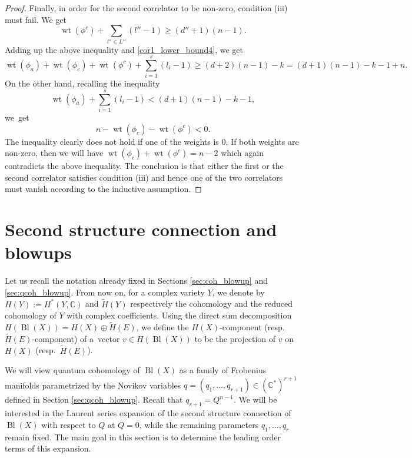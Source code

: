 \documentclass[pdftex]{sigma}
\numberwithin{equation}{section}
\newcommand{\CC}{\mathbb{C}}
\begin{document}
\begin{proof}
Finally, in order for the second correlator to be non-zero, condition (iii) must fail. We get
\[
\operatorname{wt}(\phi^c) + \sum_{l''\in L''} (l''-1) \geq (d''+1)(n-1).
\]
Adding up the above inequality and \eqref{cor1_lower_bound4}, we get
\[
\operatorname{wt}(\phi_a) + \operatorname{wt}(\phi_c) + \operatorname{wt}(\phi^c)+
\sum_{i=1}^s (l_i-1) \geq (d+2)(n-1) -k = (d+1)(n-1)-k-1 + n.
\]
On the other hand, recalling the inequality
\[
\operatorname{wt}(\phi_a)+ \sum_{i=1}^s (l_i-1) < (d+1)(n-1)-k-1,
\]
 we~get
\[
n-\operatorname{wt}(\phi_c) - \operatorname{wt}(\phi^c) < 0.
\]
The inequality clearly does not hold if one of the weights is $0$. If both weights are non-zero, then we will have $\operatorname{wt}(\phi_c) + \operatorname{wt}(\phi^c)= n-2$ which again contradicts the above inequality. The conclusion is that either the first or the second correlator satisfies condition (iii) and hence one of the two correlators must vanish according to the inductive assumption.
\end{proof}

\section{Second structure connection and blowups}
\label{sec:2nd_sc_blowups}

Let us recall the notation already fixed in
Sections \ref{sec:coh_blowup} and \ref{sec:qcoh_blowup}. From now on, for a complex variety $Y$, we denote by $H(Y):=H^*(Y,\CC)$
and $\widetilde{H}(Y)$ respectively the cohomology and the reduced
cohomology of $Y$ with complex coefficients. Using the direct sum decomposition~$H(\operatorname{Bl}(X))=H(X)\oplus \widetilde{H}(E)$, we define the $H(X)$-component (resp.\ $\widetilde{H}(E)$-component) of a~vector $v\in H(\operatorname{Bl}(X))$ to be the projection of $v$ on $H(X)$ (resp.\ $\widetilde{H}(E)$).

We will view quantum cohomology of $\operatorname{Bl}(X)$ as a family of
Frobenius manifolds parametrized by the Novikov variables $q=(q_1,\dots,q_{r+1})\in (\CC^*)^{r+1}$ defined in Section \ref{sec:qcoh_blowup}. Recall that ${q_{r+1}=Q^{n-1}}$. We will be
interested in the Laurent series expansion of the second structure
connection of $\operatorname{Bl}(X)$ with respect to $Q$ at $Q=0$, while the
remaining parameters $q_1,\dots, q_r$ remain fixed. The main goal in
this section is to determine the leading order terms of this expansion.
\end{document}
